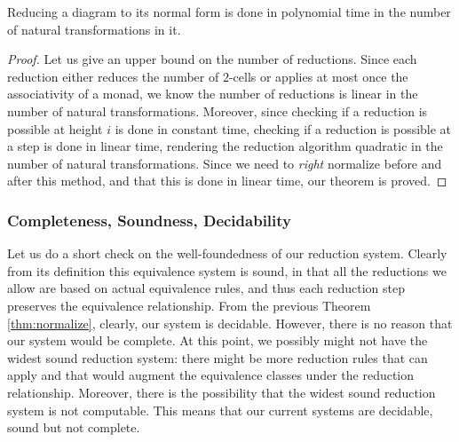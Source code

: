 \begin{thm}
	\label{thm:normalize}
	Reducing a diagram to its normal form is done in polynomial time in
	the number of natural transformations in it.
\end{thm}
\begin{proof}
	Let us give an upper bound on the number of reductions.
	Since each reduction either reduces the number of $2$-cells or applies at
	most once the associativity of a monad, we know the number of reductions is
	linear in the	number of natural transformations.
	Moreover, since checking if a reduction is possible at height $i$ is done in
	constant time, checking if a reduction is possible at a step is done in
	linear time, rendering the reduction algorithm quadratic in the number of
	natural transformations.
	Since we need to \emph{right} normalize before and after this method, and
	that this is done in linear time, our theorem is proved.
\end{proof}

\subsubsection{Completeness, Soundness, Decidability}\label{subsubsec:sanity}
Let us do a short check on the well-foundedness of our reduction system.
Clearly from its definition this equivalence system is sound, in that all the
reductions we allow are based on actual equivalence rules, and thus each
reduction step preserves the equivalence relationship.
From the previous Theorem \ref{thm:normalize}, clearly, our system is decidable.
However, there is no reason that our system would be complete.
At this point, we possibly might not have the widest sound reduction system:
there might be more reduction rules that can apply and that would
augment the equivalence classes under the reduction relationship.
Moreover, there is the possibility that the widest sound reduction system is
not computable.
This means that our current systems are decidable, sound but not complete.
